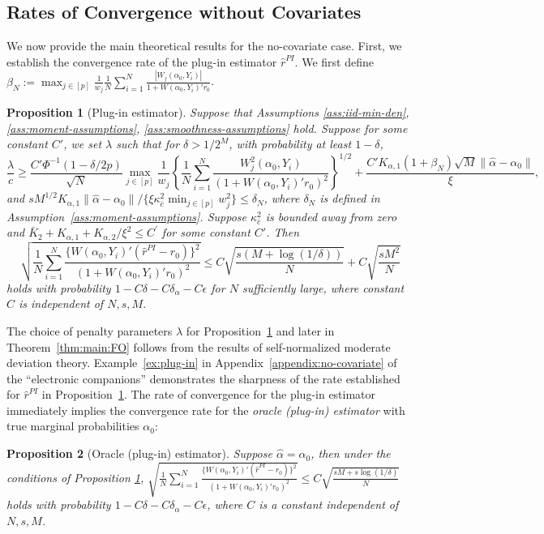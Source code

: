 \documentclass[11pt]{article}
\newtheorem{proposition}{Proposition}
\begin{document}
\subsection{Rates of Convergence without Covariates}\label{Sec:Rates:no-covariates}
We now provide the main theoretical results for the no-covariate case. First, we establish the convergence rate of the plug-in estimator $\hat{r}^{PI}$. We first define $\displaystyle\beta_N := \max_{j\in[p]}\frac{1}{w_j}\frac{1}{N}\sum_{i=1}^N \frac{|W_j(\alpha_0,Y_i)|}{1+W(\alpha_0,Y_i)'r_0}$. 
\begin{proposition}[Plug-in estimator]\label{prop:plug-in:no-covariate}
Suppose that Assumptions \ref{ass:iid-min-den}, \ref{ass:moment-assumptions}, \ref{ass:smoothness-assumptions} hold. Suppose for some constant $C'$, we set $\lambda$ such that for $\delta>1/2^M$, with probability at least $1-\delta$, 
$$\frac{\lambda}{c}\geq\frac{C'\Phi^{-1}(1-\delta/2p)}{\sqrt{N}}\max_{j\in[p]} \frac{1}{w_j}\left\{\frac{1}{N}\sum_{i=1}^N \frac{W_j^2(\alpha_0,Y_i)}{(1+W(\alpha_0,Y_i)'r_0)^2}\right\}^{1/2}\!\!\!\!+\frac{C'K_{\alpha,1}(1+\beta_N)\sqrt{M}\|\hat\alpha-\alpha_0\|}{\xi},$$
and $sM^{1/2}K_{\alpha,1}\|\hat\alpha-\alpha_0\|/ \{\xi\kappa_{\bar c}^2\min_{j\in[p]}w_j^2\}\leq \delta_N$, where $\delta_N$ is defined in Assumption~\ref{ass:moment-assumptions}. Suppose $\kappa_{\bar{c}}^2$ is bounded away from zero and $\bar K_2 + K_{\alpha,1} + K_{\alpha,2}/\xi^2 \leq C^\prime$ for some constant $C'$. Then $$\displaystyle\sqrt{\frac{1}{N}\sum_{i=1}^N \frac{\{W(\alpha_0,Y_i)'(\hat r^{PI} - r_0 )\}^2}{(1+W(\alpha_0,Y_i)'r_0)^2}}\leq C\sqrt{\frac{s(M+\log(1/\delta))}{N}} + C\sqrt{\frac{sM^2}{N}}$$ 
holds with probability $1-C\delta-C\delta_\alpha-C\epsilon$ for $N$ sufficiently large, where constant $C$ is independent of $N,s,M$.
\end{proposition}
The choice of penalty parameters $\lambda$ for Proposition~\ref{prop:plug-in:no-covariate} and later in Theorem~\ref{thm:main:FO} follows from the results of self-normalized moderate deviation theory. Example~\ref{ex:plug-in} in Appendix~\ref{appendix:no-covariate} of the ``electronic companions'' demonstrates the sharpness of the rate established for $\hat{r}^{PI}$ in Proposition~\ref{prop:plug-in:no-covariate}.
The rate of convergence for the plug-in estimator immediately implies the convergence rate for the \textit{oracle (plug-in) estimator} with true marginal probabilities $\alpha_0$:
\begin{proposition}[Oracle (plug-in) estimator]\label{prop:PI:infeasible}
Suppose $\hat{\alpha}=\alpha_0$, then under the conditions of Proposition \ref{prop:plug-in:no-covariate}, $\displaystyle\sqrt{\frac{1}{N}\sum_{i=1}^N \frac{\{W(\alpha_0,Y_i)'(\hat r^{PI} - r_0 )\}^2}{(1+W(\alpha_0,Y_i)'r_0)^2}} \leq  C\sqrt{\frac{sM+s\log(1/\delta)}{N}}$ holds with probability $1-C\delta-C\delta_\alpha-C\epsilon$, where $C$ is a constant independent of $N,s,M$.
\end{proposition}
\end{document}
